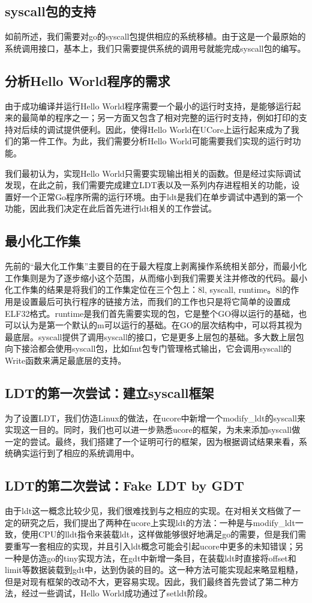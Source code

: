 \documentclass{article}
\begin{document}
\subsection{syscall包的支持}
如前所述，我们需要对go的syscall包提供相应的系统移植。由于这是一个最原始的系统调用接口，基本上，我们只需要提供系统的调用号就能完成syscall包的编写。

\subsection{分析Hello World程序的需求}
由于成功编译并运行Hello World程序需要一个最小的运行时支持，是能够运行起来的最简单的程序之一；另一方面又包含了相对完整的运行时支持，例如打印的支持对后续的调试提供便利。因此，使得Hello World在UCore上运行起来成为了我们的第一件工作。为此，我们需要分析Hello World可能需要我们实现的运行时功能。

我们最初认为，实现Hello World只需要实现输出相关的函数。但是经过实际调试发现，在此之前，我们需要完成建立LDT表以及一系列内存进程相关的功能，设置好一个正常Go程序所需的运行环境。由于ldt是我们在单步调试中遇到的第一个功能，因此我们决定在此后首先进行ldt相关的工作尝试。

\subsection{最小化工作集}
先前的“最大化工作集”主要目的在于最大程度上剥离操作系统相关部分，而最小化工作集则是为了逐步缩小这个范围，从而缩小到我们需要关注并修改的代码。最小化工作集的结果是将我们的工作集定位在三个包上：8l, syscall, runtime。8l的作用是设置最后可执行程序的链接方法，而我们的工作也只是将它简单的设置成ELF32格式。runtime是我们首先需要实现的包，它是整个GO得以运行的基础，也可以认为是第一个默认的m可以运行的基础。在GO的层次结构中，可以将其视为最底层。syscall提供了调用syscall的接口，它是更多上层包的基础。多大数上层包向下接洽都会使用syscall包，比如fmt包专门管理格式输出，它会调用syscall的Write函数来满足最底层的支持。

\subsection{LDT的第一次尝试：建立syscall框架}
为了设置LDT，我们仿造Linux的做法，在ucore中新增一个modify\_ldt的syscall来实现这一目的。同时，我们也可以进一步熟悉ucore的框架，为未来添加syscall做一定的尝试。最终，我们搭建了一个证明可行的框架，因为根据调试结果来看，系统确实运行到了相应的系统调用中。

\subsection{LDT的第二次尝试：Fake LDT by GDT}
由于ldt这一概念比较少见，我们很难找到与之相应的实现。在对相关文档做了一定的研究之后，我们提出了两种在ucore上实现ldt的方法：一种是与modify\_ldt一致，使用CPU的lldt指令来装载ldt，这样做能够很好地满足go的需要，但是我们需要重写一套相应的实现，并且引入ldt概念可能会引起ucore中更多的未知错误；另一种是仿造go的tiny实现方法，在gdt中新增一条目，在装载ldt时直接将offset和limit等数据装载到gdt中，达到伪装的目的。这一种方法可能实现起来略显粗糙，但是对现有框架的改动不大，更容易实现。因此，我们最终首先尝试了第二种方法，经过一些调试，Hello World成功通过了setldt阶段。
\end{document}
